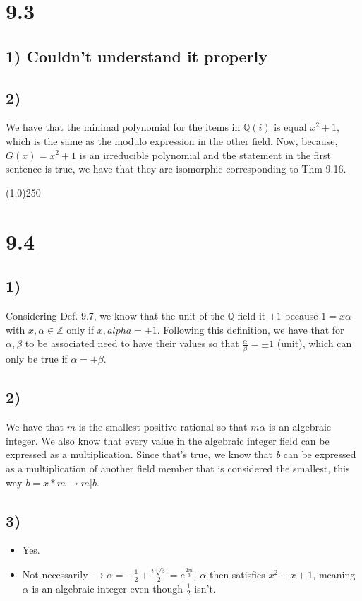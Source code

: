 \documentclass[11pt]{article}
\begin{document}
\section*{9.3}
\label{sec:orgbc98d89}
\subsection*{1) Couldn't understand it properly}
\label{sec:orge54390d}
\subsection*{2)}
\label{sec:orgae42a9c}
We have that the minimal polynomial for the items in \(\mathbb{Q}(i)\) is equal \(x^2 + 1\), which is the same as the modulo expression in the other field. Now, because, \(G(x) = x^2 + 1\) is an irreducible polynomial and the statement in the first sentence is true, we have that they are isomorphic corresponding to Thm 9.16.

\begin{center}
\line(1,0){250}
\end{center}

\section*{9.4}
\label{sec:orgcd7ac03}
\subsection*{1)}
\label{sec:orge55e917}
Considering Def. 9.7, we know that the unit of the \(\mathbb{Q}\) field it \(\pm 1\) because \(1 = x\alpha\) with \(x, \alpha \in \mathbb{Z}\) only if \(x, alpha = \pm 1\). Following this definition, we have that for \(\alpha, \beta\) to be associated need to have their values so that \(\frac{\alpha}{\beta} = \pm 1\) (unit), which can only be true if \(\alpha = \pm \beta\).
\subsection*{2)}
\label{sec:orga39400e}
We have that \(m\) is the smallest positive rational so that \(m\alpha\) is an algebraic integer. We also know that every value in the algebraic integer field can be expressed as a multiplication. Since that's true, we know that \emph{b} can be expressed as a multiplication of another field member that is considered the smallest, this way \(b = x * m \to m|b\). 
\subsection*{3)}
\label{sec:orge5453ee}
\begin{itemize}
\item Yes.
\item Not necessarily \(\to \alpha = -\frac{1}{2} + \frac{i\sqrt[3]3}{2} = e^{\frac{2\pi i}{3}}\). \(\alpha\) then satisfies \(x^2 + x + 1\), meaning \(\alpha\) is an algebraic integer even though \(\frac{1}{2}\) isn't.
\end{itemize}
\end{document}
